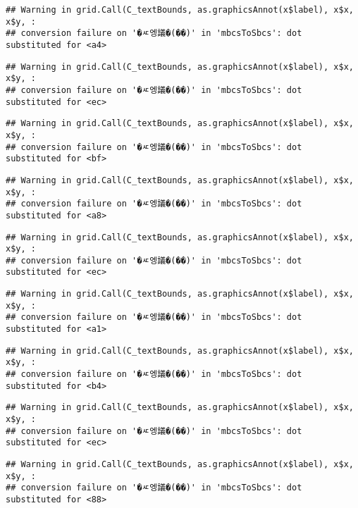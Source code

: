 \documentclass[
]{article}
\begin{document}
\begin{verbatim}
## Warning in grid.Call(C_textBounds, as.graphicsAnnot(x$label), x$x, x$y, :
## conversion failure on '�ㅼ엥議�(��)' in 'mbcsToSbcs': dot substituted for <a4>
\end{verbatim}

\begin{verbatim}
## Warning in grid.Call(C_textBounds, as.graphicsAnnot(x$label), x$x, x$y, :
## conversion failure on '�ㅼ엥議�(��)' in 'mbcsToSbcs': dot substituted for <ec>
\end{verbatim}

\begin{verbatim}
## Warning in grid.Call(C_textBounds, as.graphicsAnnot(x$label), x$x, x$y, :
## conversion failure on '�ㅼ엥議�(��)' in 'mbcsToSbcs': dot substituted for <bf>
\end{verbatim}

\begin{verbatim}
## Warning in grid.Call(C_textBounds, as.graphicsAnnot(x$label), x$x, x$y, :
## conversion failure on '�ㅼ엥議�(��)' in 'mbcsToSbcs': dot substituted for <a8>
\end{verbatim}

\begin{verbatim}
## Warning in grid.Call(C_textBounds, as.graphicsAnnot(x$label), x$x, x$y, :
## conversion failure on '�ㅼ엥議�(��)' in 'mbcsToSbcs': dot substituted for <ec>
\end{verbatim}

\begin{verbatim}
## Warning in grid.Call(C_textBounds, as.graphicsAnnot(x$label), x$x, x$y, :
## conversion failure on '�ㅼ엥議�(��)' in 'mbcsToSbcs': dot substituted for <a1>
\end{verbatim}

\begin{verbatim}
## Warning in grid.Call(C_textBounds, as.graphicsAnnot(x$label), x$x, x$y, :
## conversion failure on '�ㅼ엥議�(��)' in 'mbcsToSbcs': dot substituted for <b4>
\end{verbatim}

\begin{verbatim}
## Warning in grid.Call(C_textBounds, as.graphicsAnnot(x$label), x$x, x$y, :
## conversion failure on '�ㅼ엥議�(��)' in 'mbcsToSbcs': dot substituted for <ec>
\end{verbatim}

\begin{verbatim}
## Warning in grid.Call(C_textBounds, as.graphicsAnnot(x$label), x$x, x$y, :
## conversion failure on '�ㅼ엥議�(��)' in 'mbcsToSbcs': dot substituted for <88>
\end{verbatim}
\end{document}
